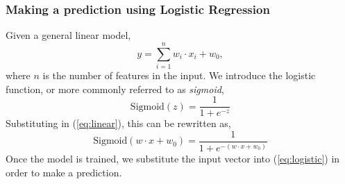 \subsubsection{Making a prediction using Logistic Regression}
Given a general linear model,
\begin{equation}
    y = \sum^{n}_{i = 1} w_{i} \cdot x_{i} + w_{0},
    \label{eq:linear}
\end{equation}
where $n$ is the number of features in the input.
We introduce the logistic function, or more commonly referred to as \emph{sigmoid}\cite{10.5555/1671238},
\begin{equation}
    \mbox{Sigmoid}(z) = \frac{1}{1 + e^{-z}}
\end{equation}
Substituting in (\ref{eq:linear}), this can be rewritten as,
\begin{equation}
    \mbox{Sigmoid}(w \cdot x + w_{0}) = \frac{1}{1 + e^{-(w \cdot x + w_{0})}}
    \label{eq:logistic}
\end{equation}
Once the model is trained, we substitute the input vector into (\ref{eq:logistic}) in order to make a prediction.
